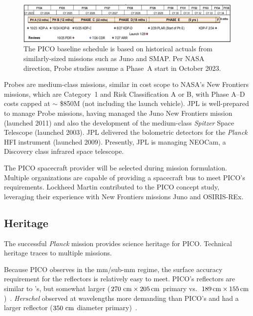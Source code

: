 \begin{figure}[hb]
\begin{center}
\includegraphics[width=\textwidth]{figures/Schedule.png}
\end{center}
\vspace{-0.25in}
\caption{\captiontext The PICO baseline schedule is based on historical actuals from similarly-sized missions such as Juno and SMAP. Per NASA direction, Probe studies assume a Phase~A start in October 2023.\label{fig:Schedule}}
\vspace{-0.05in}
\end{figure}

Probes are medium-class missions, similar in cost scope to NASA's
New Frontiers missions, which are Category~1 and Risk Classification A
or B, with Phase A--D costs capped at $\sim$ \$850M (not including the
launch vehicle). JPL is well-prepared to manage Probe missions, having
managed the Juno New Frontiers mission (launched 2011) and also the
development of the medium-class \textit{Spitzer} Space Telescope (launched
2003). JPL delivered the bolometric detectors for the \textit{Planck}
HFI instrument (launched 2009). Presently, JPL is managing NEOCam, a
Discovery class infrared space telescope.

The PICO spacecraft provider will be selected during mission
formulation. Multiple organizations are capable of providing a
spacecraft bus to meet PICO's requirements. Lockheed Martin
contributed to the PICO concept study, leveraging their experience
with New Frontiers missions Juno and OSIRIS-REx.
 
\subsection{Heritage}
\label{sec:heritage} %

The successful \textit{Planck} mission provides science heritage for
PICO. Technical heritage traces to multiple missions.

Because PICO observes in the mm/sub-mm regime, the surface accuracy requirement for the reflectors is relatively easy to meet. PICO's reflectors are similar to \planck 's, but somewhat larger ($270 \,\, {\rm cm} \times 205\,{\rm cm}$ primary vs.\ $189\,{\rm cm} \times 155\,{\rm cm}$)~\citep{Gloesener2006}. \textit{Herschel} observed at wavelengths more demanding than PICO's and had a larger reflector ($350\, \,{\rm cm}$ diameter primary)~\citep{Toulemont2004}.

